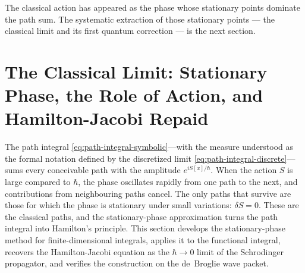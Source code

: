 \medskip\noindent The classical action has appeared as the phase whose stationary points dominate the path sum. The systematic extraction of those stationary points --- the classical limit and its first quantum correction --- is the next section.


\section{The Classical Limit: Stationary Phase, the Role of Action, and Hamilton-Jacobi Repaid}
\label{sec:classical-limit}

The path integral \eqref{eq:path-integral-symbolic}---with the measure understood as the formal notation defined by the discretized limit \eqref{eq:path-integral-discrete}---sums every conceivable path with the amplitude $e^{iS[x]/\hbar}$. When the action $S$ is large compared to $\hbar$, the phase oscillates rapidly from one path to the next, and contributions from neighbouring paths cancel. The only paths that survive are those for which the phase is stationary under small variations: $\delta S = 0$. These are the classical paths, and the stationary-phase approximation turns the path integral into Hamilton's principle. This section develops the stationary-phase method for finite-dimensional integrals, applies it to the functional integral, recovers the Hamilton-Jacobi equation as the $\hbar\to0$ limit of the Schrodinger propagator, and verifies the construction on the de~Broglie wave packet.

